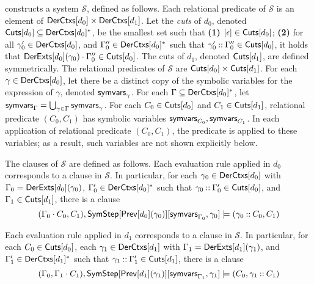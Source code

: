 \verifyders constructs a system $\mathcal{S}$, defined as follows.
Each relational predicate of $\mathcal{S}$ is an element of $\mathsf{DerCtxs}[ 
d_0  ] \times \mathsf{DerCtxs}[ d_1 ]$.
%
Let the \emph{cuts} of $d_0$, denoted $\mathsf{Cuts}[ d_0 ] \subseteq \mathsf{DerCtxs}[ 
  d_0  ]^{*}$, be the smallest set such that %
\textbf{(1)} $[ \epsilon ] \in \mathsf{Cuts}[  d_0  ]$; %
\textbf{(2)} for all $\gamma_0' \in \mathsf{DerCtxs}[  d_0  ]$, and %
$\Gamma_0'' \in \mathsf{DerCtxs}[  d_0  ]^{*}$ such that $\gamma_0' \mathbin{::}
\Gamma_0'' \in \mathsf{Cuts}[  d_0  ]$, %
it holds that $\mathsf{DerExts}[  d_0  ](\gamma_0) \cdot \Gamma_0'' \in
\mathsf{Cuts}[ d_0 ]$.
%
The cuts of $d_1$, denoted $\mathsf{Cuts}[ d_1 ]$, are defined symmetrically.
The relational predicates of $\mathcal{S}$ are $\mathsf{Cuts}[ d_0 ] \times
\mathsf{Cuts}[ d_1 ]$.
%
For each $\gamma \in \mathsf{DerCtxs}[ d_0 ]$, let there be a distinct copy of
the symbolic variables for the expression of $\gamma$, denoted
$\mathsf{symvars}_{ \gamma }$.
%
For each $\Gamma \subseteq \mathsf{DerCtxs}[ d_0 ]^{*}$, let 
$\mathsf{symvars}_{ \Gamma } = \bigcup_{ \gamma \in \Gamma} \mathsf{symvars}_{\gamma}$.
%
For each $C_0 \in \mathsf{Cuts}[  d_0  ]$ and $C_1 \in \mathsf{Cuts}[  d_1  ]$, relational
predicate $(C_0, C_1)$ has symbolic variables $\mathsf{symvars}_{C_0},
\mathsf{symvars}_{C_1}$.
%
In each application of relational predicate $(C_0, C_1)$, the
predicate is applied to these variables;
%
as a result, such variables are not shown explicitly below.

The clauses of $\mathcal{S}$ are defined as follows.
%
Each evaluation rule applied in $d_0$ corresponds to a clause in
$\mathcal{S}$.
% 
In particular, for each $\gamma_0 \in \mathsf{DerCtxs}[  d_0  ]$ with $\Gamma_0
= \mathsf{DerExts}[  d_0  ]( \gamma_0 )$, %
$\Gamma_0' \in \mathsf{DerCtxs}[  d_0  ]^{*}$ such that $\gamma_0 \mathbin{::}
\Gamma_0' \in \mathsf{Cuts}[  d_0  ]$, and %
$\Gamma_1 \in \mathsf{Cuts}[  d_1  ]$, there is a clause %
\[ (\Gamma_0 \concat C_0, C_1), %
\symstep{ \prevrule{ d_0 }( \gamma_0 ) }[ %
\symvars{ \Gamma_0 }, \gamma_0 ] \entails %
(\gamma_0 \cons C_0, C_1) \]

Each evaluation rule applied in $d_1$ corresponds to a clause in
$\mathcal{S}$.
%
In particular, for each $C_0 \in \mathsf{Cuts}[  d_0  ]$, %
each $\gamma_1 \in \mathsf{DerCtxs}[  d_1  ]$ with $\Gamma_1 = \mathsf{DerExts}[ d_1 ](
\gamma_1 )$, and %
$\Gamma_1' \in \mathsf{DerCtxs}[  d_1  ]^{*}$ such that $\gamma_1 \mathbin{::}
\Gamma_1' \in \mathsf{Cuts}[  d_1  ]$, there is a clause
\[ ( \Gamma_0, \Gamma_1 \concat C_1), %
\symstep{ \prevrule{ d_1 }( \gamma_1 ) }[ %
\symvars{ \Gamma_1 }, \gamma_1 ] \entails %
(C_0, \gamma_1 \cons C_1) 
\]

